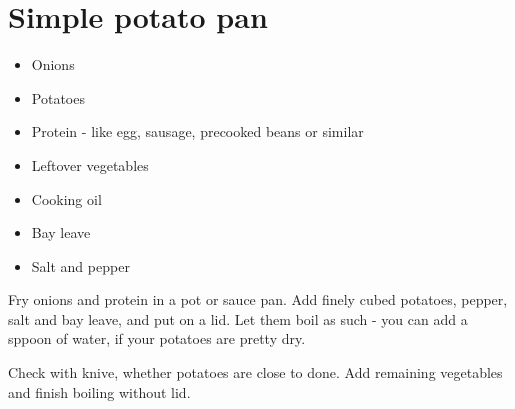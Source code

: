 \section{Simple potato pan}{
  \begin{itemize}
    \item Onions
    \item Potatoes
    \item Protein - like egg, sausage, precooked beans or similar
    \item Leftover vegetables
    \item Cooking oil
    \item Bay leave
    \item Salt and pepper
  \end{itemize}
  \vspace{.25in}

  Fry onions and protein in a pot or sauce pan. Add finely cubed potatoes,
  pepper, salt and bay leave,
  and put on a lid. Let them boil as such - you can add a sppoon of water, if
  your potatoes are pretty dry.

  Check with knive, whether potatoes are
  close to done.
  Add remaining vegetables and finish boiling without lid.

}
